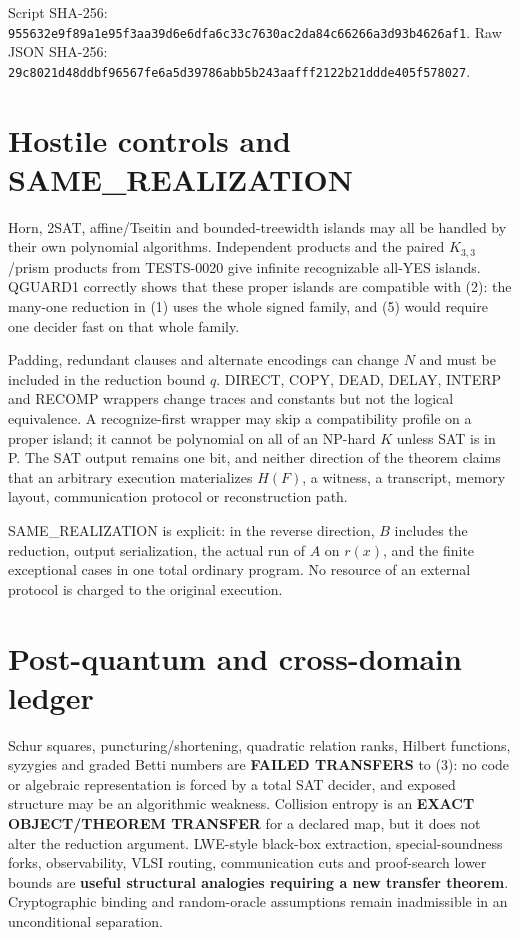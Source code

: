 \documentclass[11pt]{article}
\begin{document}
Script SHA-256:
\nolinkurl{955632e9f89a1e95f3aa39d6e6dfa6c33c7630ac2da84c66266a3d93b4626af1}.
Raw JSON SHA-256:
\nolinkurl{29c8021d48ddbf96567fe6a5d39786abb5b243aafff2122b21ddde405f578027}.

\section{Hostile controls and SAME\_REALIZATION}

Horn, 2SAT, affine/Tseitin and bounded-treewidth islands may all be handled by
their own polynomial algorithms.  Independent products and the paired
$K_{3,3}$/prism products from TESTS-0020 give infinite recognizable all-YES
islands.  QGUARD1 correctly shows that these proper islands are compatible
with (2): the many-one reduction in (1) uses the whole signed family, and (5)
would require one decider fast on that whole family.

Padding, redundant clauses and alternate encodings can change $N$ and must be
included in the reduction bound $q$.  DIRECT, COPY, DEAD, DELAY, INTERP and
RECOMP wrappers change traces and constants but not the logical equivalence.
A recognize-first wrapper may skip a compatibility profile on a proper
island; it cannot be polynomial on all of an NP-hard $K$ unless SAT is in P.
The SAT output remains one bit, and neither direction of the theorem claims
that an arbitrary execution materializes $H(F)$, a witness, a transcript,
memory layout, communication protocol or reconstruction path.

SAME\_REALIZATION is explicit: in the reverse direction, $B$ includes the
reduction, output serialization, the actual run of $A$ on $r(x)$, and the
finite exceptional cases in one total ordinary program.  No resource of an
external protocol is charged to the original execution.

\section{Post-quantum and cross-domain ledger}

Schur squares, puncturing/shortening, quadratic relation ranks, Hilbert
functions, syzygies and graded Betti numbers are \textbf{FAILED TRANSFERS} to
(3): no code or algebraic representation is forced by a total SAT decider,
and exposed structure may be an algorithmic weakness.  Collision entropy is
an \textbf{EXACT OBJECT/THEOREM TRANSFER} for a declared map, but it does not
alter the reduction argument.  LWE-style black-box extraction,
special-soundness forks, observability, VLSI routing, communication cuts and
proof-search lower bounds are \textbf{useful structural analogies requiring a
new transfer theorem}.  Cryptographic binding and random-oracle assumptions
remain inadmissible in an unconditional separation.
\end{document}
